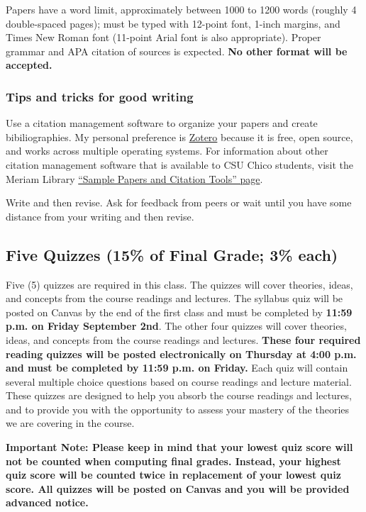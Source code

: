 \documentclass[11pt,]{article}
\begin{document}
Papers have a word limit, approximately between 1000 to 1200 words
(roughly 4 double-spaced pages); must be typed with 12-point font,
1-inch margins, and Times New Roman font (11-point Arial font is also
appropriate). Proper grammar and APA citation of sources is expected.
\textbf{No other format will be accepted.}

\hypertarget{tips-and-tricks-for-good-writing}{%
\subsubsection{Tips and tricks for good
writing}\label{tips-and-tricks-for-good-writing}}

Use a citation management software to organize your papers and create
bibiliographies. My personal preference is
\href{https://www.zotero.org/}{Zotero} because it is free, open source,
and works across multiple operating systems. For information about other
citation management software that is available to CSU Chico students,
visit the Meriam Library
\href{https://libguides.csuchico.edu/c.php?g=432300\&p=2948649}{``Sample
Papers and Citation Tools'' page}.

Write and then revise. Ask for feedback from peers or wait until you
have some distance from your writing and then revise.

\hypertarget{quizzes}{%
\subsection{Five Quizzes (15\% of Final Grade; 3\%
each)}\label{quizzes}}

Five (5) quizzes are required in this class. The quizzes will cover
theories, ideas, and concepts from the course readings and lectures. The
syllabus quiz will be posted on Canvas by the end of the first class and
must be completed by \textbf{11:59 p.m. on Friday September 2nd}. The
other four quizzes will cover theories, ideas, and concepts from the
course readings and lectures. \textbf{These four required reading
quizzes will be posted electronically on Thursday at 4:00 p.m. and must
be completed by 11:59 p.m. on Friday.} Each quiz will contain several
multiple choice questions based on course readings and lecture material.
These quizzes are designed to help you absorb the course readings and
lectures, and to provide you with the opportunity to assess your mastery
of the theories we are covering in the course.

\textbf{Important Note: Please keep in mind that your lowest quiz score
will not be counted when computing final grades. Instead, your highest
quiz score will be counted twice in replacement of your lowest quiz
score. All quizzes will be posted on Canvas and you will be provided
advanced notice.}
\end{document}
